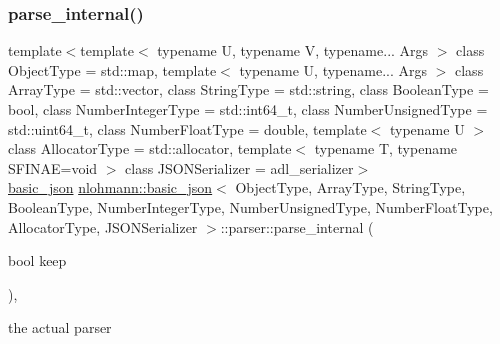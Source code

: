 \subsubsection{\texorpdfstring{parse\+\_\+internal()}{parse\_internal()}}
{\footnotesize\ttfamily template$<$template$<$ typename U, typename V, typename... Args $>$ class Object\+Type = std\+::map, template$<$ typename U, typename... Args $>$ class Array\+Type = std\+::vector, class String\+Type  = std\+::string, class Boolean\+Type  = bool, class Number\+Integer\+Type  = std\+::int64\+\_\+t, class Number\+Unsigned\+Type  = std\+::uint64\+\_\+t, class Number\+Float\+Type  = double, template$<$ typename U $>$ class Allocator\+Type = std\+::allocator, template$<$ typename T, typename S\+F\+I\+N\+A\+E=void $>$ class J\+S\+O\+N\+Serializer = adl\+\_\+serializer$>$ \\
\hyperlink{classnlohmann_1_1basic__json}{basic\+\_\+json} \hyperlink{classnlohmann_1_1basic__json}{nlohmann\+::basic\+\_\+json}$<$ Object\+Type, Array\+Type, String\+Type, Boolean\+Type, Number\+Integer\+Type, Number\+Unsigned\+Type, Number\+Float\+Type, Allocator\+Type, J\+S\+O\+N\+Serializer $>$\+::parser\+::parse\+\_\+internal (\begin{DoxyParamCaption}\item[{bool}]{keep }\end{DoxyParamCaption})\hspace{0.3cm}{\ttfamily [inline]}, {\ttfamily [private]}}



the actual parser 

\mbox{\label{classnlohmann_1_1basic__json_1_1parser_a08e23e71af8623c8371c251480071f73}} 
